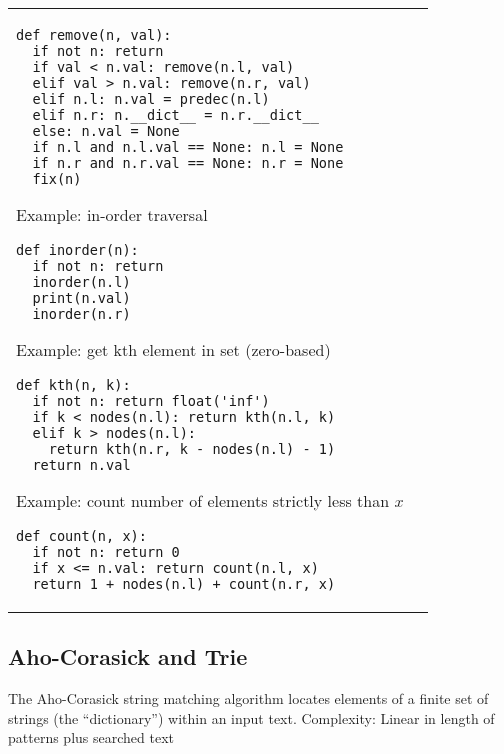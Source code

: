 \documentclass[letterpaper]{article}
\begin{document}
\begin{tabular}{@{}p{9cm}p{9cm}@{}}
\begin{lstlisting}
def remove(n, val):
  if not n: return
  if val < n.val: remove(n.l, val)
  elif val > n.val: remove(n.r, val)
  elif n.l: n.val = predec(n.l)
  elif n.r: n.__dict__ = n.r.__dict__
  else: n.val = None
  if n.l and n.l.val == None: n.l = None
  if n.r and n.r.val == None: n.r = None
  fix(n)
\end{lstlisting}
    Example: in-order traversal
    \begin{lstlisting}
def inorder(n):
  if not n: return
  inorder(n.l)
  print(n.val)
  inorder(n.r)
\end{lstlisting}
    Example: get kth element in set (zero-based)
    \begin{lstlisting}
def kth(n, k):
  if not n: return float('inf')
  if k < nodes(n.l): return kth(n.l, k)
  elif k > nodes(n.l):
    return kth(n.r, k - nodes(n.l) - 1)
  return n.val
\end{lstlisting}
    Example: count number of elements strictly less than $x$
    \begin{lstlisting}
def count(n, x):
  if not n: return 0
  if x <= n.val: return count(n.l, x)
  return 1 + nodes(n.l) + count(n.r, x)
\end{lstlisting}
\end{tabular}
\clearpage
\subsection{Aho-Corasick and Trie}

The Aho-Corasick string matching algorithm locates elements of a finite set of strings (the ``dictionary'') within an input text. Complexity: Linear in length of patterns plus searched text
\end{document}
